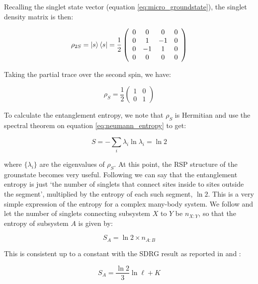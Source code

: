 Recalling the singlet state vector (equation \ref{eq:micro_groundstate}), the singlet density matrix is then:

\begin{equation}\label{eq:micro_groundstate_explicit}
	\rho_{2S} = \ket{s}\bra{s} = \frac{1}{2}\left(\begin{array}{cccc}
0 & 0 & 0 & 0 \\
0 & 1 & -1 & 0 \\
0 & -1 & 1 & 0 \\
0 & 0 & 0 & 0
\end{array}\right)
\end{equation}

Taking the partial trace over the second spin, we have:

\begin{equation}
\rho_S=\frac{1}{2}\left(\begin{array}{ll}
1 & 0 \\
0 & 1
\end{array}\right)
\end{equation}

To calculate the entanglement entropy, we note that $\rho_S$ is Hermitian and use the spectral theorem on equation \ref{eq:neumann_entropy} to get:

\begin{equation}
	S = - \sum_i \lambda_i \ln{\lambda_i} = \ln{2}
\end{equation}

where $\{\lambda_i\}$ are the eigenvalues of $\rho_S$. At this point, the RSP structure of the grounstate becomes very useful. Following \cite{refael2004} we can say that the entanglement entropy is just `the number of singlets that connect sites inside to sites outside the segment', multiplied by the entropy of each such segment, $\ln{2}$. This is a very simple expression of the entropy for a complex many-body system. We follow \cite{paola2016} and let the number of singlets connecting subsystem $X$ to $Y$ be $n_{X:Y}$, so that the entropy of subsystem $A$ is given by:

\begin{equation}
	S_A = \ln{2} \times n_{A: B}
\end{equation}

This is consistent up to a constant with the SDRG result as reported in \cite{paola2016} and \cite{Laflorencie2018}:

\begin{equation}
S_{A}=\frac{\ln 2}{3} \ln \ell+K
\end{equation}

